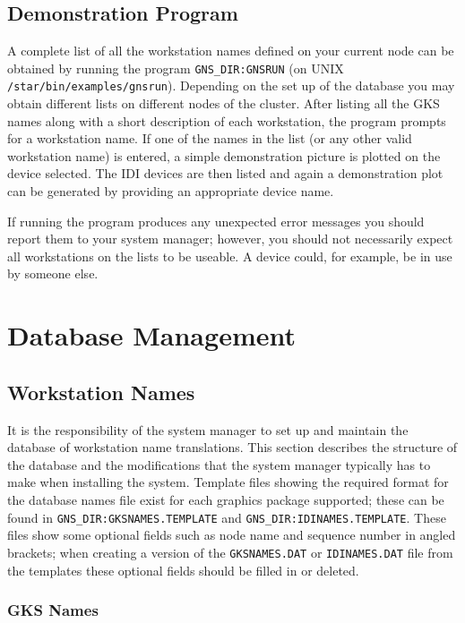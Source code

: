 \subsection{Demonstration Program}\label{demo-prog}

A complete list of all the workstation names defined on your current node can
be obtained by running the program {\tt GNS\_DIR:GNSRUN} (on UNIX
{\tt /star/bin/examples/gnsrun}). Depending on the set up of the database
you may obtain different lists on different nodes of the cluster.
After listing all the GKS names along with a short description of each
workstation, the program prompts for a workstation name. If one of the names
in the list (or any other valid workstation name) is entered, a simple
demonstration picture is plotted on the device selected. The IDI devices are
then listed and again a demonstration plot can be generated by providing an
appropriate device name.

If running the program produces any unexpected error messages
you should report them to your system manager; however, you should not
necessarily expect all workstations on the lists to be useable. A device could,
for example, be in use by someone else.

\section{Database Management}\label{dm}
\subsection{Workstation Names}\label{dwn}

It is the responsibility of the system manager to set up and maintain the
database of workstation name translations.
This section describes the structure of the database and the modifications
that the system manager typically has to make when installing the system.
Template files showing the required format for the database names file
exist for each graphics package supported; these can be found in
{\tt GNS\_DIR:GKSNAMES.TEMPLATE} and {\tt GNS\_DIR:IDINAMES.TEMPLATE}.
These files show some optional fields such as node name and sequence number
in angled brackets; when creating a version of the {\tt GKSNAMES.DAT} or
{\tt IDINAMES.DAT} file from the templates these optional fields should be
filled in or deleted.

\subsubsection{GKS Names}\label{GKS-names}

